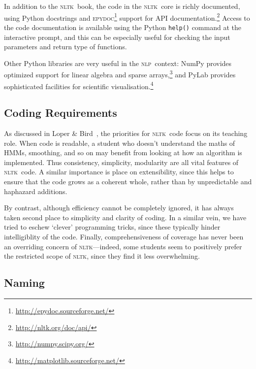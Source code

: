 \documentclass[11pt]{article}
\newcommand{\NLP}{\textsc{nlp}}
\newcommand{\NLTK}{\textsc{nltk}}
\newcommand{\code}[1]{\texttt{\small #1}}
\begin{document}
In addition to the \NLTK\ book, the code in the \NLTK\ core is richly
documented, using Python docstrings and
\textsc{epydoc}\footnote{\url{http://epydoc.sourceforge.net/}} support
for API documentation.\footnote{\url{http://nltk.org/doc/api/}} Access
to the code documentation is available using the Python \code{help()}
command at the interactive prompt, and this can be especially useful
for checking the input parameters and return type of functions.

Other Python libraries are very useful in the \NLP\ context: NumPy
provides optimized support for linear algebra and sparse
arrays,\footnote{\url{http://numpy.scipy.org/}} and PyLab provides
sophisticated facilities for scientific
visualisation.\footnote{\url{http://matplotlib.sourceforge.net/}}



\subsection{Coding Requirements}

As discussed in Loper \& Bird~, the priorities for \NLTK\ code
focus on its teaching role. When code is readable, a student who
doesn't understand the maths of HMMs, smoothing, and so on may benefit
from looking at how an algorithm is implemented. Thus consistency,
simplicity, modularity are all vital features of \NLTK\ code. A
similar importance is place on extensibility, since this helps to
ensure that the code grows as a coherent whole, rather than by
unpredictable and haphazard additions.  

By contrast, although efficiency cannot be completely ignored, it has
always taken second place to simplicity and clarity of coding. In a
similar vein, we have tried to eschew `clever' programming tricks,
since these typically hinder intelligiblity of the code.  Finally,
comprehensiveness of coverage has never been an overriding concern of
\NLTK---indeed, some students seem to positively prefer the restricted
scope of \NLTK, since they find it less overwhelming. 


\subsection{Naming}
\end{document}
